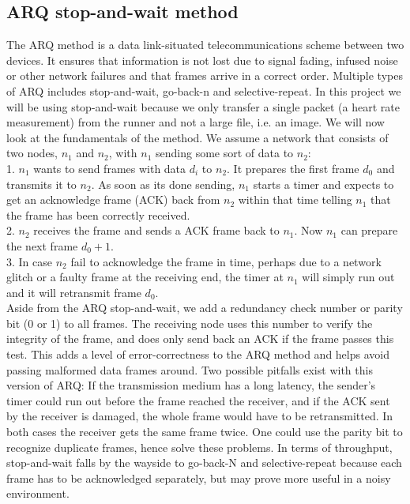 \subsection{ARQ stop-and-wait method}\label{th:arq}

The ARQ method is a data link-situated telecommunications scheme between two devices. It ensures that information is not lost due to signal fading, infused noise or other network failures and that frames arrive in a correct order. Multiple types of ARQ includes stop-and-wait, go-back-n and selective-repeat. In this project we will be using stop-and-wait because we only transfer a single packet (a heart rate measurement) from the runner and not a large file, i.e. an image. We will now look at the fundamentals of the method. We assume a network that consists of two nodes, $n_1$ and $n_2$, with $n_1$ sending some sort of data to $n_2$: \newline \\
1. $n_1$ wants to send frames with data $d_i$ to $n_2$. It prepares the first frame $d_0$ and transmits it to $n_2$. As soon as its done sending, $n_1$ starts a timer and expects to get an acknowledge frame (ACK) back from $n_2$ within that time telling $n_1$ that the frame has been correctly received. \newline \\
2. $n_2$ receives the frame and sends a ACK frame back to $n_1$. Now $n_1$ can prepare the next frame $d_0+1$. \newline \\
3. In case $n_2$ fail to acknowledge the frame in time, perhaps due to a network glitch or a faulty frame at the receiving end, the timer at $n_1$ will simply run out and it will retransmit frame $d_0$. \newline \\
\noindent Aside from the ARQ stop-and-wait, we add a redundancy check number or parity bit (0 or 1) to all frames. The receiving node uses this number to verify the integrity of the frame, and does only send back an ACK if the frame passes this test. This adds a level of error-correctness to the ARQ method and helps avoid passing malformed data frames around. Two possible pitfalls exist with this version of ARQ: If the transmission medium has a long latency, the sender's timer could run out before the frame reached the receiver, and if the ACK sent by the receiver is damaged, the whole frame would have to be retransmitted. In both cases the receiver gets the same frame twice. One could use the parity bit to recognize duplicate frames, hence solve these problems. In terms of throughput, stop-and-wait falls by the wayside to go-back-N and selective-repeat because each frame has to be acknowledged separately, but may prove more useful in a noisy environment.
